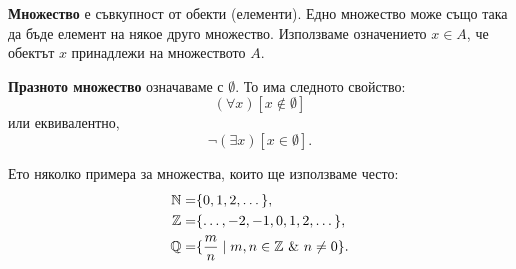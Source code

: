 
{\bf Множество} е съвкупност от обекти (елементи).
Едно множество може също така да бъде елемент на някое друго множество.
Използваме означението $x \in A$, 
че обектът $x$ принадлежи на множеството $A$.

{\bf Празното множество} означаваме с $\emptyset$.
То има следното свойство:
\[(\forall x)[x \not \in \emptyset]\]
или еквивалентно,
\[\neg (\exists x)[x \in \emptyset].\]

\begin{example}
  Ето няколко примера за множества, които ще използваме често:
  \begin{align*}
    \mathbb{N} = & \{0,1,2,\dots\},\\
    \mathbb{Z} = & \{\dots,-2,-1,0,1,2,\dots\},\\
    \mathbb{Q} = & \{\frac{m}{n} \mid m,n \in \mathbb{Z}\ \&\ n \neq 0\}.
  \end{align*}

\end{example}






